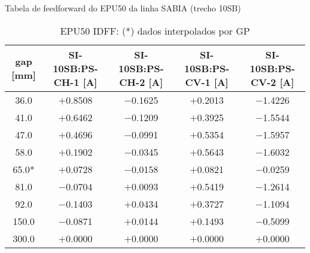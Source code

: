 \documentclass[oneside]{article}
\begin{document}
{}
\begin{landscape}
\centering
\Huge{Tabela de feedforward do EPU50 da linha SABIA (trecho 10SB)}

\vspace{1cm}
\begin{table}[!h]
\LARGE
\centering
\begin{tabular}{c|c|c|c|c}
\hline\hline
gap {[}mm{]} & SI-10SB:PS-CH-1 {[}A{]} & SI-10SB:PS-CH-2 {[}A{]} & SI-10SB:PS-CV-1 {[}A{]} & SI-10SB:PS-CV-2 {[}A{]} \\
\hline\hline
36.0                 & $+$0.8508   & $-$0.1625   & $+$0.2013   & $-$1.4226 \\ \hline
41.0                 & $+$0.6462   & $-$0.1209   & $+$0.3925   & $-$1.5544 \\ \hline
47.0                 & $+$0.4696   & $-$0.0991   & $+$0.5354   & $-$1.5957 \\ \hline
58.0                 & $+$0.1902   & $-$0.0345   & $+$0.5643   & $-$1.6032 \\ \hline
65.0*                & $+$0.0728   & $-$0.0158   & $+$0.0821   & $-$0.0259 \\ \hline
81.0                 & $-$0.0704   & $+$0.0093   & $+$0.5419   & $-$1.2614 \\ \hline
92.0                 & $-$0.1403   & $+$0.0434   & $+$0.3727   & $-$1.1094 \\ \hline
150.0                & $-$0.0871   & $+$0.0144   & $+$0.1493   & $-$0.5099 \\ \hline
300.0                & $+$0.0000   & $+$0.0000   & $+$0.0000   & $+$0.0000 \\
\hline
\hline
\end{tabular}
\label{tab:ffwd_table}
\caption{EPU50 IDFF: (*) dados interpolados por GP}
\end{table}
\end{landscape}
\end{document}
